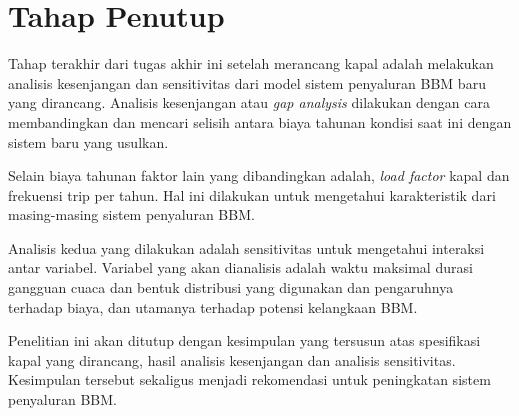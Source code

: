 \section{Tahap Penutup}
\label{sec:tahap-penutup}

    Tahap terakhir dari tugas akhir ini setelah merancang kapal adalah melakukan analisis kesenjangan dan sensitivitas dari model sistem penyaluran BBM baru yang dirancang. Analisis kesenjangan atau \emph{gap analysis} dilakukan dengan cara membandingkan dan mencari selisih antara biaya tahunan kondisi saat ini dengan sistem baru yang usulkan.

    Selain biaya tahunan faktor lain yang dibandingkan adalah, \emph{load factor} kapal dan frekuensi trip per tahun. Hal ini dilakukan untuk mengetahui karakteristik dari masing-masing sistem penyaluran BBM.

    Analisis kedua yang dilakukan adalah sensitivitas untuk mengetahui interaksi antar variabel. Variabel yang akan dianalisis adalah waktu maksimal durasi gangguan cuaca dan bentuk distribusi yang digunakan dan pengaruhnya terhadap biaya, dan utamanya terhadap potensi kelangkaan BBM.

    Penelitian ini akan ditutup dengan kesimpulan yang tersusun atas spesifikasi kapal yang dirancang, hasil analisis kesenjangan dan analisis sensitivitas. Kesimpulan tersebut sekaligus menjadi rekomendasi untuk peningkatan sistem penyaluran BBM.